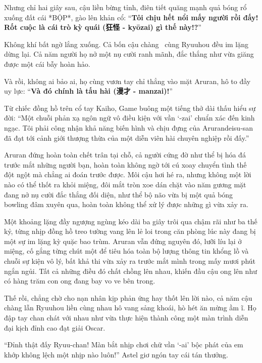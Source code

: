 \documentclass[../main.tex]{subfiles}
\begin{document}
Nhưng chỉ hai giây sau, cậu liền bừng tỉnh, điên tiết quăng mạnh quả bóng rổ xuống đất cái *BỘP*, gào lên khản cổ: ``\textbf{Tôi chịu hết nổi mấy người rồi đấy! Rốt cuộc là cái trò kỳ quái (狂怪 - kyōzai) gì thế này!?}''

Không khí bất ngờ lắng xuống. Cả bốn cậu chàng \hls\ cùng Ryuuhou đều im lặng dừng lại. Cả năm người họ nở một nụ cười ranh mãnh, đắc thắng như vừa giăng được một cái bẫy hoàn hảo.

Và rồi, không ai bảo ai, họ cùng vươn tay chỉ thẳng vào mặt Aruran, hô to đầy uy lực: ``\textbf{Và đó chính là tấu hài (漫才 - manzai)!}''


Từ chiếc đồng hồ trên cổ tay Kaiho, Game buông một tiếng thở dài thấu hiểu sự đời: ``Một chuỗi phản xạ ngôn ngữ vô điều kiện với vần `-zai' chuẩn xác đến kinh ngạc. Tôi phải công nhận khả năng biến hình và chịu đựng của Arurandeisu-san đã đạt tới cảnh giới thượng thừa của một diễn viên hài chuyên nghiệp rồi đấy.''

Aruran đứng hoàn toàn chết trân tại chỗ, cả người cứng đờ như thể bị hóa đá trước mắt những người bạn, hoàn toàn không ngờ tới cú xoay chuyển tình thế đột ngột mà chẳng ai đoán trước được. Môi cậu hơi hé ra, nhưng không một lời nào có thể thốt ra khỏi miệng, đôi mắt tròn xoe dán chặt vào năm gương mặt đang nở nụ cười đắc thắng đối diện, như thể bộ não vừa bị một quả bóng bowling đâm xuyên qua, hoàn toàn không thể xử lý được những gì vừa xảy ra.

Một khoảng lặng đầy ngượng ngùng kéo dài ba giây trôi qua chậm rãi như ba thế kỷ, từng nhịp đồng hồ treo tường vang lên lẻ loi trong căn phòng lúc này đang bị một sự im lặng kỳ quặc bao trùm. Aruran vẫn đứng nguyên đó, lưỡi líu lại ở miệng, cố gắng từng chút một để tiêu hóa toàn bộ lượng thông tin khổng lồ và chuỗi sự kiện vô lý, bất khả thi vừa xảy ra trước mắt mình trong mấy mươi phút ngắn ngủi. Tất cả những điều đó chất chồng lên nhau, khiến đầu cậu ong lên như có hàng trăm con ong đang bay vo ve bên trong.

Thế rồi, chẳng chờ cho nạn nhân kịp phản ứng hay thốt lên lời nào, cả năm cậu chàng lẫn Ryuuhou liền cùng nhau hô vang sảng khoái, hò hét ăn mừng ầm ĩ. Họ đập tay chan chát với nhau như vừa thực hiện thành công một màn trình diễn đại kịch đỉnh cao đạt giải Oscar.


``Đỉnh thật đấy Ryuu-chan! Màn bắt nhịp chơi chữ vần `-ai' bộc phát của em khớp không lệch một nhịp nào luôn!'' Astel giơ ngón tay cái tán thưởng.
\end{document}
